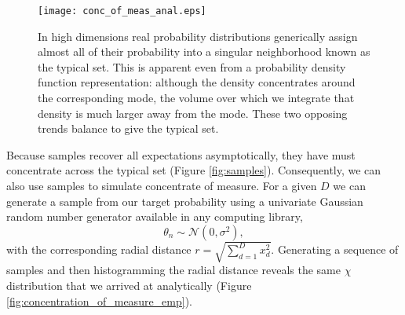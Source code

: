 \documentclass[11pt, oneside]{article}
\begin{document}
\begin{figure*}
\centering
\texttt{[image: conc\_of\_meas\_anal.eps]}
\caption{In high dimensions real probability distributions generically 
assign almost all of their probability into a singular neighborhood known as
the typical set.  This is apparent even from a probability density function 
representation: although the density concentrates around the corresponding
mode, the volume over which we integrate that density is much larger away
from the mode.  These two opposing trends balance to give the typical set.}
\label{fig:conc_of_meas_anal}
\end{figure*}

Because samples recover all expectations asymptotically, they have
must concentrate across the typical set (Figure \ref{fig:samples}).
Consequently, we can also use samples to simulate concentrate of 
measure.  For a given $D$ we can generate a sample from our target 
probability using a univariate Gaussian random number generator 
available in any computing library,
%
\begin{equation*}
\theta_{n} \sim \mathcal{N} \! \left(0, \sigma^{2} \right),
\end{equation*}
%
with the corresponding radial distance $r = \sqrt{ \sum_{d = 1}^{D} x_{d}^{2} }$.
Generating a sequence of samples and then histogramming the radial 
distance reveals the same $\chi$ distribution that we arrived at analytically
(Figure \ref{fig:concentration_of_measure_emp}).
\end{document}
